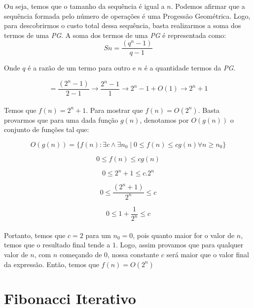 \documentclass[a4paper, 12pt]{article}
\begin{document}
Ou seja, temos que o tamanho da sequência é igual a $n$. Podemos afirmar que a sequência formada pelo número de operações é uma Progessão Geométrica. Logo, para descobrirmos o custo total dessa sequência, basta realizarmos a soma dos termos de uma {\it PG}. A soma dos termos de uma {\it PG} é representada como:
\begin{equation}
Sn = \dfrac{(q^{n}-1)}{q-1}
\end{equation}

Onde $q$ é a razão de um termo para outro e $n$ é a quantidade termos da {\it PG}.

\begin{equation}
= \dfrac{(2^{n}-1)}{2-1} \rightarrow \dfrac{2^{n}-1}{1} \rightarrow 2^{n}-1 + O(1) \rightarrow 2^{n}+1
\end{equation}\\

Temos que $f(n)=2^n+1$. Para mostrar que $f(n)=O(2^n)$. Basta provarmos que para uma dada função $g(n)$, denotamos por $O(g(n))$ o conjunto de funções
tal que: 

\begin{equation}
O(g(n)) = \{f(n) : \exists c \wedge \exists n_0 \mid 0 \leq f(n) \leq cg(n) \forall n \geq n_0 \}
\end{equation}

\begin{equation}
0 \leq f(n) \leq cg(n)
\end{equation}

\begin{equation}
0 \leq 2^n+1 \leq c.2^n
\end{equation}

\begin{equation}
0 \leq \frac{(2^n+1)}{2^n} \leq c
\end{equation}

\begin{equation}
0 \leq 1+\frac{1}{2^n} \leq c
\end{equation}\\

Portanto, temos que $c=2$ para um $n_0=0$, pois quanto maior for o valor de $n$, temos que o resultado final tende a $1$. Logo, assim provamos que para qualquer valor de $n$, com $n$ começando de $0$, nossa constante $c$ será maior que o valor final da expressão. Então, temos que $f(n)=O(2^n)$

\newpage 
\section{Fibonacci Iterativo}
\end{document}
